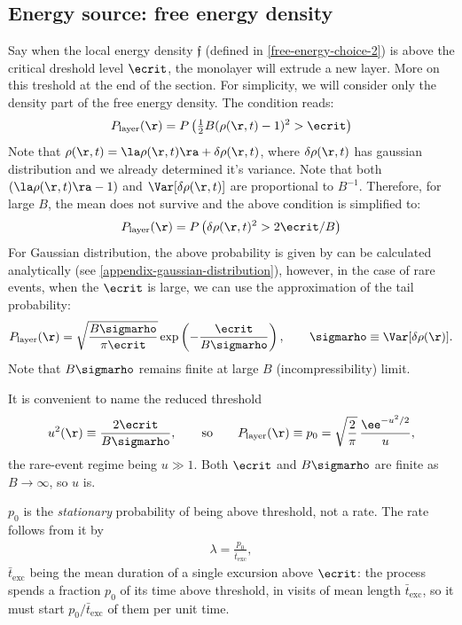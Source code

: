 

\subsection{Energy source: free energy density}
\label{sec-extrusion-free-energy}
Say when the local energy density $\mathfrak{f}$ (defined in \cref{free-energy-choice-2}) is above the critical dreshold level $\ecrit$, the monolayer will extrude a new layer. More on this treshold at the end of the section.
For simplicity, we will consider only the density part of the free energy density.
The condition reads:
\begin{align}
    P_\text{layer}(\r) = P\left(\tfrac{1}{2}B (\rho(\r,t) - 1)^2 > \ecrit\right) 
\end{align}
Note that $\rho(\r,t) = \la \rho(\r,t) \ra + \delta\rho(\r,t)$, where $\delta\rho(\r,t)$ has gaussian distribution and we already determined it's variance. Note that both $\left(\la \rho(\r,t) \ra-1\right)$ and $\Var[\delta\rho(\r,t)]$ are proportional to $B^{-1}$. Therefore, for large $B$, the mean does not survive and the above condition is simplified to:
\begin{align}
    P_\text{layer}(\r) = P\left(\delta\rho(\r,t)^2 > 2\ecrit/ B\right) 
\end{align}
For Gaussian distribution, the above probability is given by can be calculated analytically (see \cref{appendix-gaussian-distribution}), however, in the case of rare events, when the $\ecrit$ is large, we can use the approximation of the tail probability:
\begin{align}
    P_\text{layer}(\r)
    = \sqrt{\frac{B \sigmarho}{\pi \ecrit}}\exp\left(
    -\frac{\ecrit}{B \sigmarho}
    \right),
    \qquad
    \sigmarho \equiv \Var[\delta\rho(\r)] .
\end{align}
Note that $B\sigmarho$ remains finite at large $B$ (incompressibility) limit.

It is convenient to name the reduced threshold
\begin{align}
    \label{eq:u-def}
    u^2(\r) \equiv \frac{2\ecrit}{B\sigmarho},
    \qquad\text{so}\qquad
    P_\text{layer}(\r) \equiv p_0 = \sqrt{\frac{2}{\pi}}\,\frac{\ee^{-u^2/2}}{u},
\end{align}
the rare-event regime being $u\gg1$. Both $\ecrit$ and $B\sigmarho$ are finite as $B\to\infty$, so $u$ is.

$p_0$ is the \emph{stationary} probability of being above threshold, not a rate. The rate follows from it by
\begin{align}
    \label{eq:rate-occupation}
    \lambda = \frac{p_0}{\bar t_\mathrm{exc}},
\end{align}
$\bar t_\mathrm{exc}$ being the mean duration of a single excursion above $\ecrit$: the process spends a fraction $p_0$ of its time above threshold, in visits of mean length $\bar t_\mathrm{exc}$, so it must start $p_0/\bar t_\mathrm{exc}$ of them per unit time.

